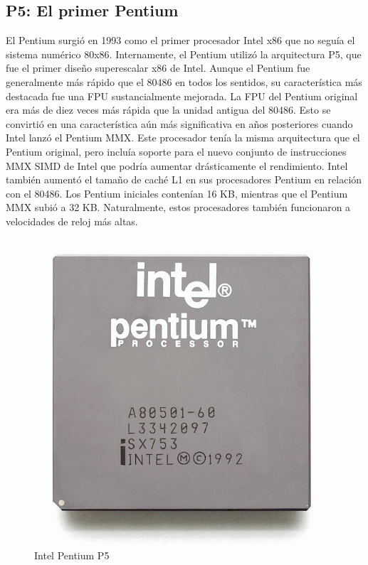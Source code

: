 \subsection{P5: El primer Pentium}
El Pentium surgió en 1993 como el primer procesador Intel x86 que no seguía el sistema numérico 80x86. Internamente, el Pentium utilizó la arquitectura P5, que fue el 
primer diseño superescalar x86 de Intel. Aunque el Pentium fue generalmente más rápido que el 80486 en todos los sentidos, su característica más destacada fue una FPU 
sustancialmente mejorada. La FPU del Pentium original era más de diez veces más rápida que la unidad antigua del 80486. Esto se convirtió en una característica aún más 
significativa en años posteriores cuando Intel lanzó el Pentium MMX. Este procesador tenía la misma arquitectura que el Pentium original, pero incluía soporte para el 
nuevo conjunto de instrucciones MMX SIMD de Intel que podría aumentar drásticamente el rendimiento. Intel también aumentó el tamaño de caché L1 en sus procesadores Pentium 
en relación con el 80486. Los Pentium iniciales contenían 16 KB, mientras que el Pentium MMX subió a 32 KB. Naturalmente, estos procesadores también funcionaron a 
velocidades de reloj más altas.

\begin{figure}[htb]
	\centering
	\includegraphics[scale = 0.15]{Graphics/Intel_Pentium_P5.jpg}
	\caption{Intel Pentium P5}
	\label{fig:22}
\end{figure}

